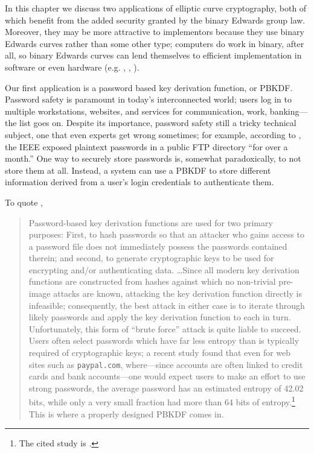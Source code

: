 \label{chp:app}

In this chapter we discuss two applications of elliptic curve cryptography,
    both of which benefit from the added security granted by the binary Edwards
    group law.
Moreover, they may be more attractive to implementors because they use binary
    Edwards curves rather than some other type; computers do work in binary,
    after all, so binary Edwards curves can lend themselves to efficient
    implementation in software or even hardware (e.g.
    \cite{chatterjee2011fpga}, \cite{kocabas2009hardware},
    \cite{kocabas2010implementation}).


Our first application is a password based key derivation function, or PBKDF.
Password safety is paramount in today's interconnected world; users log in to
    multiple workstations, websites, and services for communication, work,
    banking---the list goes on.
Despite its importance, password safety still a tricky technical subject, one
    that even experts get wrong sometimes; for example, according to
    \cite{arstechnica}, the IEEE exposed plaintext passwords in a public FTP
    directory ``for over a month.''
One way to securely store passwords is, somewhat paradoxically, to not store
    them at all.
Instead, a system can use a PBKDF to store different information derived from a
user's login credentials to authenticate them.

To quote \cite{percival2009stronger},
\begin{quote}
Password-based key derivation functions are used for two primary purposes:
    First, to hash passwords so that an attacker who gains access to a password
    file does not immediately possess the passwords contained therein; and
    second, to generate cryptographic keys to be used for encrypting and/or
    authenticating data.
\ldots Since all modern key derivation functions are constructed from hashes
    against which no non-trivial pre-image attacks are known, attacking the key
    derivation function directly is infeasible; consequently, the best attack
    in either case is to iterate through likely passwords and apply the key
    derivation function to each in turn.
Unfortunately, this form of ``brute force'' attack is quite liable to succeed.
Users often select passwords which have far less entropy than is typically
    required of cryptographic keys; a recent study found that even for web
    sites such as \texttt{paypal.com}, where---since accounts are often linked
    to credit cards and bank accounts---one would expect users to make an
    effort to use strong passwords, the average password has an estimated
    entropy of 42.02 bits, while only a very small fraction had more than 64
    bits of entropy.\footnote{The cited study is \cite{florencio2007large}.}
This is where a properly designed PBKDF comes in.
\end{quote}

